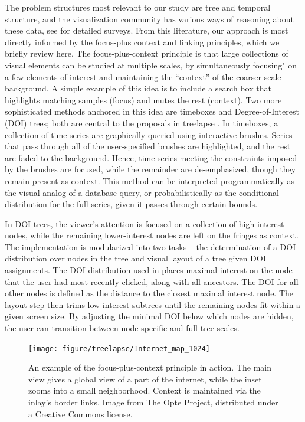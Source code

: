 The problem structures most relevant to our study are tree and temporal
structure, and the visualization community has various ways of reasoning about
these data, see \citep{graham2010survey, aigner2011visualization} for detailed
surveys. From this literature, our approach is most directly informed by the
focus-plus context and linking principles, which we briefly review here. The
focus-plus-context principle is that large collections of visual elements can be
studied at multiple scales, by simultaneously focusing" on a few elements of
interest and maintaining the ``context'' of the coarser-scale background. A
simple example of this idea is to include a search box that highlights matching
samples (focus) and mutes the rest (context). Two more sophisticated methods
anchored in this idea are timeboxes and Degree-of-Interest (DOI) trees; both are
central to the proposals in treelapse \citep{hochheiser2004dynamic,
  heer2004doitrees}. In timeboxes, a collection of time series are graphically
queried using interactive brushes. Series that pass through all of the
user-specified brushes are highlighted, and the rest are faded to the
background. Hence, time series meeting the constraints imposed by the brushes
are focused, while the remainder are de-emphasized, though they remain present
as context. This method can be interpreted programmatically as the visual analog
of a database query, or probabilistically as the conditional distribution for
the full series, given it passes through certain bounds.

In DOI trees, the viewer's attention is focused on a collection of high-interest
nodes, while the remaining lower-interest nodes are left on the fringes as
context. The implementation is modularized into two tasks -- the determination
of a DOI distribution over nodes in the tree and visual layout of a tree given
DOI assignments. The DOI distribution used in \citep{heer2004doitrees} places
maximal interest on the node that the user had most recently clicked, along with
all ancestors. The DOI for all other nodes is defined as the distance to the
closest maximal interest node. The layout step then trims low-interest subtrees
until the remaining nodes fit within a given screen size. By adjusting the
minimal DOI below which nodes are hidden, the user can transition between
node-specific and full-tree scales.

\begin{figure}
  \centering
  \texttt{[image: figure/treelapse/Internet\_map\_1024]}
  \caption{An example of the focus-plus-context principle in action. The main
    view gives a global view of a part of the internet, while the inset zooms
    into a small neighborhood. Context is maintained via the inlay's border
    links. Image from The Opte Project, distributed under a Creative Commons
    license. \label{fig:internet_map}}
\end{figure}

